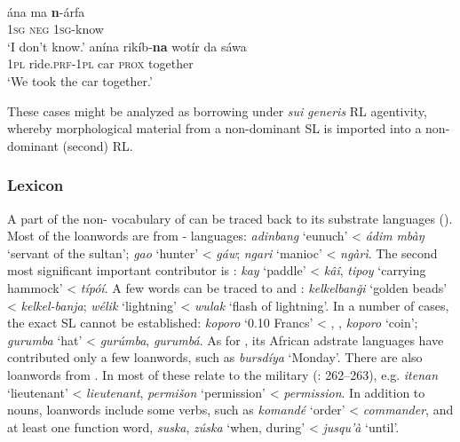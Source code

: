 \documentclass[output=paper]{langsci/langscibook}
\begin{document}
\ea
{  \citep[181]{Luffin2013}}\\
\ea
\gll ána ma \textbf{n}-árfa \\
         1\textsc{sg} \textsc{neg} 1\textsc{sg}-know\\
\glt    `I don’t know.'
\ex
\gll  anína rikíb-\textbf{na} wotír da sáwa \\
         1\textsc{pl} ride.\textsc{prf}-1\textsc{pl} car \textsc{prox} together\\
\glt    `We took the car together.’
\z
\z
 
{These cases might be analyzed as borrowing under \textit{sui} \textit{generis} {RL} agentivity, whereby morphological material from a non-dominant {SL} is imported into a non-dominant (second) {RL}.}


 \subsubsection{Lexicon}

A part of the non- vocabulary of  can be traced back to its {substrate} languages (\citealt{Avram2019}). Most of the {loanwords} are from - languages: \textit{adinbang} ‘eunuch’ <  \textit{ádim} \textit{mbàŋ} ‘servant of the sultan’; \textit{gao} ‘hunter’ <  \textit{gáw}; \textit{ngari} ‘manioc’ <  \textit{ngàrì}. The second most significant important contributor is : \textit{kay} ‘paddle’ <  \textit{kâî}, \textit{tipoy} ‘carrying hammock’ < \textit{típóí}. A few words can be traced to  and : \textit{kelkelbanǧi} ‘golden beads’ <  \textit{kelkel-banja}; \textit{wélik} ‘lightning’ <  \textit{wulak} ‘flash of lightning’. In a number of cases, the exact {SL} cannot be established: \textit{koporo} ‘0.10 Francs’ < , ,  \textit{koporo} ‘coin’; \textit{gurumba} ‘hat’ <  \textit{gurúmba},  \textit{gurumbá}. As for  , its African {adstrate} languages have contributed only a few {loanwords}, such as \textit{bursdíya} ‘Monday’. There are also {loanwords} from . In  most of these relate to the military (\citealt{ToscoOwens1993}: 262–263), e.g.  \textit{itenan} ‘lieutenant’ <  \textit{lieutenant}, \textit{permišon} ‘permission’ <  \textit{permission}. In addition to nouns,  {loanwords} include some verbs, such as   \textit{komandé} ‘order’ <  \textit{commander}, and at least one function word,  \textit{suska},   \textit{zúska} ‘when, during’ <  \textit{jusqu’à} ‘until’.
\end{document}
